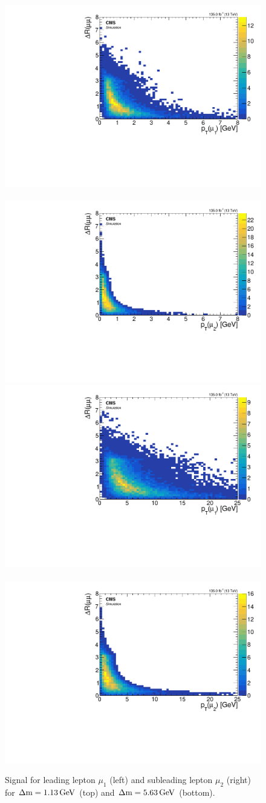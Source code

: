 \begin{figure}[!htb]
\centering
\includegraphics[width=0.48\linewidth]{plots/signal_muons_gen_delta_r_vs_pt/none_gen_delta_r_vs_pt_1.pdf} \,
\includegraphics[width=0.48\linewidth]{plots/signal_muons_gen_delta_r_vs_pt/none_gen_delta_r_vs_pt_2.pdf}  \\
\includegraphics[width=0.48\linewidth]{plots/signal_muons_gen_delta_r_vs_pt_dm5/none_gen_delta_r_vs_pt_1.pdf} \,
\includegraphics[width=0.48\linewidth]{plots/signal_muons_gen_delta_r_vs_pt_dm5/none_gen_delta_r_vs_pt_2.pdf}  \\
\caption[Signal \drmm \vs \pt]{ Signal \drmm \vs \pt for leading lepton $\mu_1$ (left) and subleading lepton $\mu_2$ (right) for $\Delta\mathrm{m}=1.13\,\text{Ge\hspace{-.08em}V}$ (top) and $\Delta\mathrm{m}=5.63\,\text{Ge\hspace{-.08em}V}$ (bottom).}
\label{fig:signal-gen-dr-pt}
\end{figure}

